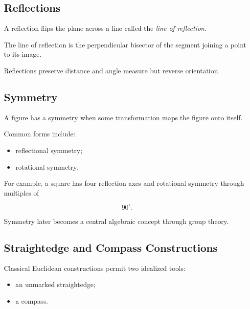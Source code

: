 \subsection{Reflections}
\label{subsec:euclidean-reflections}

A reflection flips the plane across a line called the \emph{line of
reflection}.

The line of reflection is the perpendicular bisector of the segment joining
a point to its image.

Reflections preserve distance and angle measure but reverse orientation.

\subsection{Symmetry}
\label{subsec:euclidean-symmetry}

A figure has a symmetry when some transformation maps the figure onto itself.

Common forms include:

\begin{itemize}
    \item reflectional symmetry;
    \item rotational symmetry.
\end{itemize}

For example, a square has four reflection axes and rotational symmetry
through multiples of

\[ 90^\circ. \]

Symmetry later becomes a central algebraic concept through group theory.

\subsection{Straightedge and Compass Constructions}
\label{subsec:straightedge-compass}

Classical Euclidean constructions permit two idealized tools:

\begin{itemize}
    \item an unmarked straightedge;
    \item a compass.
\end{itemize}

